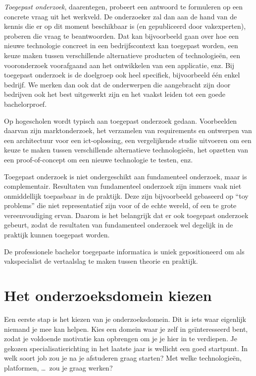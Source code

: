 \emph{Toegepast onderzoek}, daarentegen, probeert een antwoord te formuleren op een concrete vraag uit het werkveld. De onderzoeker zal dan aan de hand van de kennis die er op dit moment beschikbaar is (en gepubliceerd door vakexperten), proberen die vraag te beantwoorden. Dat kan bijvoorbeeld gaan over hoe een nieuwe technologie concreet in een bedrijfscontext kan toegepast worden, een keuze maken tussen verschillende alternatieve producten of technologieën, een vooronderzoek voorafgaand aan het ontwikkelen van een applicatie, enz. Bij toegepast onderzoek is de doelgroep ook heel specifiek, bijvoorbeeld één enkel bedrijf. We merken dan ook dat de onderwerpen die aangebracht zijn door bedrijven ook het best uitgewerkt zijn en het vaakst leiden tot een goede bachelorproef.

Op hogescholen wordt typisch aan toegepast onderzoek gedaan. Voorbeelden daarvan zijn marktonderzoek, het verzamelen van requirements en ontwerpen van een architectuur voor een ict-oplossing, een vergelijkende studie uitvoeren om een keuze te maken tussen verschillende alternatieve technologieën, het opzetten van een proof-of-concept om een nieuwe technologie te testen, enz.

Toegepast onderzoek is niet ondergeschikt aan fundamenteel onderzoek, maar is complementair. Resultaten van fundamenteel onderzoek zijn immers vaak niet onmiddellijk toepasbaar in de praktijk. Deze zijn bijvoorbeeld gebaseerd op ``toy problems'' die niet representatief zijn voor of de echte wereld, of een te grote vereenvoudiging ervan. Daarom is het belangrijk dat er ook toegepast onderzoek gebeurt, zodat de resultaten van fundamenteel onderzoek wel degelijk in de praktijk kunnen toegepast worden.

De professionele bachelor toegepaste informatica is uniek gepositioneerd om als vakspecialist de vertaalslag te maken tussen theorie en praktijk.

\section{Het onderzoeksdomein kiezen}%
\label{sec:het_onderzoeksdomein_kiezen}

Een eerste stap is het kiezen van je onderzoeksdomein. Dit is iets waar eigenlijk niemand je mee kan helpen. Kies een domein waar je zelf in geïnteresseerd bent, zodat je voldoende motivatie kan opbrengen om je je hier in te verdiepen. Je gekozen specialisatierichting in het laatste jaar is wellicht een goed startpunt. In welk soort job zou je na je afstuderen graag starten? Met welke technologieën, platformen, \ldots\ zou je graag werken?

